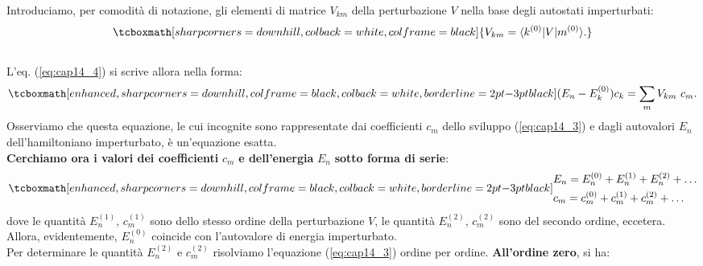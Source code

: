 \documentclass[a4paper,12pt,oneside]{book}
\begin{document}
Introduciamo, per comodità di notazione, gli elementi di matrice $V_{km}$ della perturbazione $V$ nella base degli autostati imperturbati:
	\begin{equation}
		\tcboxmath[sharp corners=downhill, colback=white, colframe=black]{
			V_{km} = \langle k^{(0)}\vert V\vert m^{(0)}\rangle.
			}
	\end{equation}\\
	
L'eq. (\ref{eq:cap14_4}) si scrive allora nella forma:
	\begin{equation}
		\tcboxmath[enhanced, sharp corners=downhill, colframe=black, colback=white, borderline={2pt}{-3pt}{black}]{
		(E_n - E_k ^{(0)}) c_k = \sum _m V_{km}\ c_m .
		}
	\label{eq:cap14_5}
	\end{equation}
Osserviamo che questa equazione, le cui incognite sono rappresentate dai coefficienti $c_m$ dello sviluppo (\ref{eq:cap14_3}) e dagli autovalori $E_n$ dell'hamiltoniano imperturbato, è un'equazione esatta.\\

\textbf{Cerchiamo ora i valori dei coefficienti} $c_m$ \textbf{e dell'energia} $E_n$ \textbf{sotto forma di serie}:
	\begin{equation}
		\tcboxmath[enhanced, sharp corners=downhill, colframe=black, colback=white, borderline={2pt}{-3pt}{black}]{
		\begin{aligned}
			& E_n = E_n ^{(0)}+E_n ^{(1)}+E_n ^{(2)}+\dots  \\
			& c_m = c_m ^{(0)}+c_m ^{(1)}+c_m ^{(2)}+\dots
		\end{aligned}
		}
	\end{equation}
dove le quantità $E_n ^{(1)}$, $c_m ^{(1)}$ sono dello stesso ordine della perturbazione $V$, le quantità $E_n ^{(2)}$, $c_m ^{(2)}$ sono del secondo ordine, eccetera. Allora, evidentemente, $E_n ^{(0)}$ coincide con l'autovalore di energia imperturbato.\\

Per determinare le quantità $E_n ^{(2)}$ e $c_m ^{(2)}$ risolviamo l'equazione (\ref{eq:cap14_3}) ordine per ordine. \textbf{All'ordine zero}, si ha:\\
\end{document}
